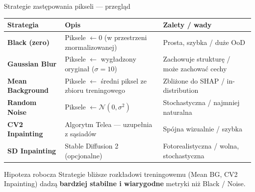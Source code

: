 \documentclass[aspectratio=169, 12pt]{beamer}
\begin{document}
\begin{frame}{Strategie zastępowania pikseli — przegląd}
  \renewcommand{\arraystretch}{1.4}
  \begin{tabular}{>{\bfseries\small}p{2.6cm}
                  >{\small}p{4.5cm}
                  >{\small}p{3.8cm}}
    \toprule
    \textbf{Strategia} & \textbf{Opis} & \textbf{Zalety / wady} \\
    \midrule
    \rowcolor{lightgray}
    Black (zero) &
      Piksele $\leftarrow 0$ (w przestrzeni znormalizowanej) &
      Prosta, szybka \textcolor{accentred}{/ duże OoD} \\

    Gaussian Blur &
      Piksele $\leftarrow$ wygładzony oryginał ($\sigma=10$) &
      Zachowuje strukturę \textcolor{accentred}{/ może zachować cechy} \\

    \rowcolor{lightgray}
    Mean Background &
      Piksele $\leftarrow$ średni piksel ze zbioru treningowego &
      Zbliżone do SHAP \textcolor{successgreen}{/ in-distribution} \\

    Random Noise &
      Piksele $\leftarrow \mathcal{N}(0, \sigma^2)$ &
      Stochastyczna \textcolor{accentred}{/ najmniej naturalna} \\

    \rowcolor{lightgray}
    CV2 Inpainting &
      Algorytm Telea — uzupełnia z sąsiadów &
      Spójna wizualnie \textcolor{successgreen}{/ szybka} \\

    SD Inpainting &
      Stable Diffusion 2 (opcjonalne) &
      Fotorealistyczna \textcolor{accentred}{/ wolna, stochastyczna} \\
    \bottomrule
  \end{tabular}

  \vspace{6pt}
  \begin{alertblock}{Hipoteza robocza}
    Strategie bliższe rozkładowi treningowemu (Mean BG, CV2 Inpainting)
    dadzą \textbf{bardziej stabilne i wiarygodne} metryki niż Black / Noise.
  \end{alertblock}
\end{frame}
\end{document}
